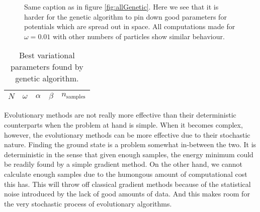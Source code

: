 \documentclass[aps,prb,twocolumn,floatfix]{revtex4}
\begin{document}
\begin{figure*}
    \centering
    \caption{Same caption as in figure \ref{fig:allGenetic}. Here we see that it is harder for the genetic algorithm to pin down good parameters for potentials which are spread out in space. All computations made for $\omega = 0.01$ with other numbers of particles show similar behaviour.}
    \label{fig:smallOmegaGenetic}
\end{figure*}

\begin{table}
\centering
\begin{tabular}{c c c c c}
    \hline
    \hline
    $N$ & $\omega$ & $\alpha$ & $\beta$ & $n_{\text{samples}}$ \\
    \hline
    
    
    
    
    \hline
    
    
    
    
    \hline
    
    
    
    
    \hline
\end{tabular}
\caption{Best variational parameters found by genetic algorithm.}
\label{tab:genetictable}
\end{table}

Evolutionary methods are not really more effective than their deterministic counterparts when the problem at hand is simple. When it becomes complex, however, the evolutionary methods can be more effective due to their stochastic nature. Finding the ground state is a problem somewhat in-between the two. It is deterministic in the sense that given enough samples, the energy minimum could be readily found by a simple gradient method. On the other hand, we cannot calculate enough samples due to the humongous amount of computational cost this has. This will throw off classical gradient methods because of the statistical noise introduced by the lack of good amounts of data. And this makes room for the very stochastic process of evolutionary algorithms.
\end{document}
